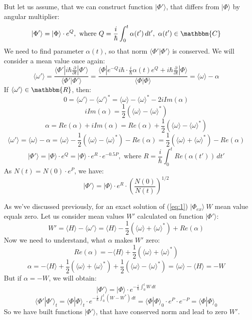 But let us assume, that we can construct function $|\Phi'\rangle$, that differs from $|\Phi\rangle$ by angular multiplier:
$$|\Phi'\rangle = |\Phi\rangle\cdot e^Q,\text{ where } Q = \frac{i}{\hbar}\int_0^t\alpha(t')\,dt',\ \alpha(t')\in\mathbbm{C}$$
We need to find parameter $\alpha(t)$, so that norm $\langle\Phi'|\Phi'\rangle$ is conserved. 
We will consider a mean value once again:
$$\langle\omega'\rangle = \frac{\langle\Phi'|i\hbar\frac{\partial}{\partial t}|\Phi'\rangle}{\langle\Phi'|\Phi'\rangle} = %
			  \frac{\langle\Phi|e^{-Q} i\hbar \cdot \frac{i}{\hbar} \alpha(t) e^Q + %
			   i\hbar\frac{\partial}{\partial t}|\Phi\rangle}{\langle\Phi|\Phi\rangle}=\langle\omega\rangle - \alpha$$
If $\langle\omega'\rangle\in\mathbbm{R}$, then:
$$0 = \langle\omega'\rangle-\langle\omega'\rangle^* = \langle\omega\rangle - \langle\omega\rangle^* - 2i\mathit{Im}( \alpha )$$
$$i\mathit{Im}( \alpha ) = \frac{1}{2}\left( \langle\omega\rangle - \langle\omega\rangle^*\right)$$
$$\alpha = \mathit{Re}( \alpha ) + i\mathit{Im}( \alpha ) = %
	   \mathit{Re}( \alpha ) + \frac{1}{2}\left( \langle\omega\rangle - \langle\omega\rangle^*\right)$$
$$\langle\omega'\rangle = \langle\omega\rangle - \alpha = %
			  \langle\omega\rangle - \frac{1}{2}\left(\langle\omega\rangle - %
								  \langle\omega\rangle^*\right) - \mathit{Re}( \alpha ) = %
			  \frac{1}{2}\left(\langle\omega\rangle + \langle\omega\rangle^*\right) - \mathit{Re}( \alpha )$$
$$|\Phi'\rangle = |\Phi\rangle\cdot e^Q = |\Phi\rangle\cdot e^R\cdot e^{-0.5P},%
					      \text{ where } R = \frac{i}{\hbar}\int_0^t\mathit{Re}(\alpha(t'))\,dt'$$
As $N(t) = N(0)\cdot e^P $, we have:
$$|\Phi'\rangle = |\Phi\rangle\cdot e^R\cdot\left(\frac{N(0)}{N(t)}\right)^{1/2}$$

As we've discussed previously, for an exact solution of (\ref{eq:1}) $|\Phi_{ex}\rangle\ W$ mean value equals zero.
 Let us consider mean values $W'$ calculated on function $|\Phi'\rangle$:
$$W' = \langle H\rangle - \langle\omega'\rangle = %
		      \langle H\rangle - \frac{1}{2}\left(\langle\omega\rangle+\langle\omega\rangle^*\right)+\mathit{Re}(\alpha)$$
Now we need to understand, what $\alpha$ makes $W'$ zero:
$$\mathit{Re}(\alpha) = -\langle H\rangle + \frac{1}{2}\left(\langle\omega\rangle+\langle\omega\rangle^*\right)$$
$$\alpha = -\langle H\rangle + \frac{1}{2}\left(\langle\omega\rangle+\langle\omega\rangle^*\right) +%
			      \frac{1}{2}\left(\langle\omega\rangle-\langle\omega\rangle^*\right)=%
	    \langle\omega\rangle - \langle H\rangle = -W$$
But if $\alpha = -W$, we will obtain:
$$|\Phi'\rangle = |\Phi\rangle\cdot e^{ -\frac{i}{\hbar}\int_0^t W\,dt}$$
$$\langle\Phi'|\Phi'\rangle_t = \langle\Phi|\Phi\rangle_t\cdot e^{ -\frac{i}{\hbar}\int_0^t(W-W^*)\,dt} = %
				\langle\Phi|\Phi\rangle_0\cdot e^P\cdot e^{-P} = \langle\Phi|\Phi\rangle_0$$
So we have built functions $|\Phi'\rangle$, that have conserved norm and lead to zero $W'$. 

